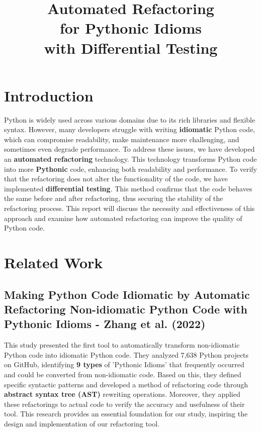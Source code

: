 \documentclass[11pt]{article}
\date{}
\title{Automated Refactoring\\for Pythonic Idioms\\with Differential Testing}
\begin{document}
\maketitle
\vspace{-2cm}
\thispagestyle{fancy}

\section{Introduction}
Python is widely used across various domains due to its rich libraries and flexible syntax. However, many developers struggle with writing \textbf{idiomatic} Python code, which can compromise readability, make maintenance more challenging, and sometimes even degrade performance. To address these issues, we have developed an \textbf{automated refactoring} technology. This technology transforms Python code into more \textbf{Pythonic} code, enhancing both readability and performance. To verify that the refactoring does not alter the functionality of the code, we have implemented \textbf{differential testing}. This method confirms that the code behaves the same before and after refactoring, thus securing the stability of the refactoring process. This report will discuss the necessity and effectiveness of this approach and examine how automated refactoring can improve the quality of Python code.

\section{Related Work}
\subsection{Making Python Code Idiomatic by Automatic Refactoring Non-idiomatic Python Code with Pythonic Idioms - Zhang et al. (2022)}
This study presented the first tool to automatically transform non-idiomatic Python code into idiomatic Python code. They analyzed 7,638 Python projects on GitHub, identifying \textbf{9 types} of 'Pythonic Idioms' that frequently occurred and could be converted from non-idiomatic code. Based on this, they defined specific syntactic patterns and developed a method of refactoring code through \textbf{abstract syntax tree (AST)} rewriting operations. Moreover, they applied these refactorings to actual code to verify the accuracy and usefulness of their tool. This research provides an essential foundation for our study, inspiring the design and implementation of our refactoring tool.
\end{document}
